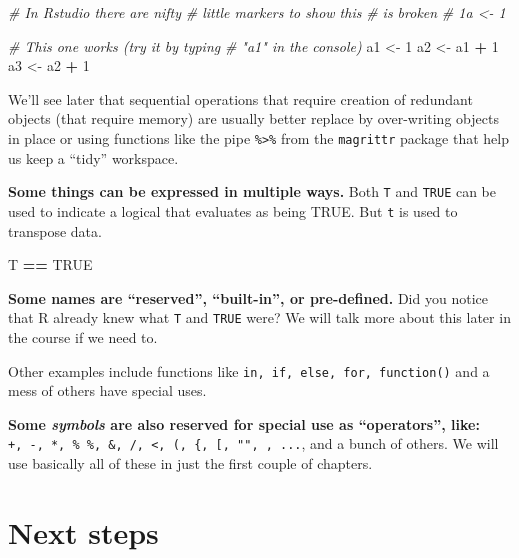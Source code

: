 \documentclass[
]{book}
\newenvironment{Shaded}{\begin{snugshade}}{\end{snugshade}}
\newcommand{\CommentTok}[1]{\textcolor[rgb]{0.56,0.35,0.01}{\textit{#1}}}
\newcommand{\DecValTok}[1]{\textcolor[rgb]{0.00,0.00,0.81}{#1}}
\newcommand{\NormalTok}[1]{#1}
\newcommand{\OperatorTok}[1]{\textcolor[rgb]{0.81,0.36,0.00}{\textbf{#1}}}
\newcommand{\OtherTok}[1]{\textcolor[rgb]{0.56,0.35,0.01}{#1}}
\newcommand{\StringTok}[1]{\textcolor[rgb]{0.31,0.60,0.02}{#1}}
\begin{document}
\begin{Shaded}
\begin{Highlighting}[]
\CommentTok{# In Rstudio there are nifty}
\CommentTok{# little markers to show this}
\CommentTok{# is broken}
\CommentTok{# 1a <- 1}

\CommentTok{# This one works (try it by typing}
\CommentTok{# "a1" in the console)}
\NormalTok{a1 <-}\StringTok{ }\DecValTok{1}
\NormalTok{a2 <-}\StringTok{ }\NormalTok{a1 }\OperatorTok{+}\StringTok{ }\DecValTok{1}
\NormalTok{a3 <-}\StringTok{ }\NormalTok{a2 }\OperatorTok{+}\StringTok{ }\DecValTok{1}
\end{Highlighting}
\end{Shaded}

We'll see later that sequential operations that require creation of redundant objects (that require memory) are usually better replace by over-writing objects in place or using functions like the pipe \texttt{\%\textgreater{}\%} from the \texttt{magrittr} package that help us keep a ``tidy'' workspace.

\textbf{Some things can be expressed in multiple ways.} Both \texttt{T} and \texttt{TRUE} can be used to indicate a logical that evaluates as being TRUE. But \texttt{t} is used to transpose data.

\begin{Shaded}
\begin{Highlighting}[]
\NormalTok{T }\OperatorTok{==}\StringTok{ }\OtherTok{TRUE}
\end{Highlighting}
\end{Shaded}

\textbf{Some names are ``reserved'', ``built-in'', or pre-defined.} Did you notice that R already knew what \texttt{T} and \texttt{TRUE} were? We will talk more about this later in the course if we need to.

Other examples include functions like \texttt{in,\ if,\ else,\ for,\ function()} and a mess of others have special uses.

\textbf{Some \emph{symbols} are also reserved for special use as ``operators'', like:}
\texttt{+,\ -,\ *,\ \%\ \%,\ \&,\ /,\ \textless{},\ (,\ \{,\ {[},\ "",\ \textquotesingle{}\textquotesingle{},\ ...}, and a bunch of others. We will use basically all of these in just the first couple of chapters.

\hypertarget{next-steps}{%
\section{Next steps}\label{next-steps}}
\end{document}
